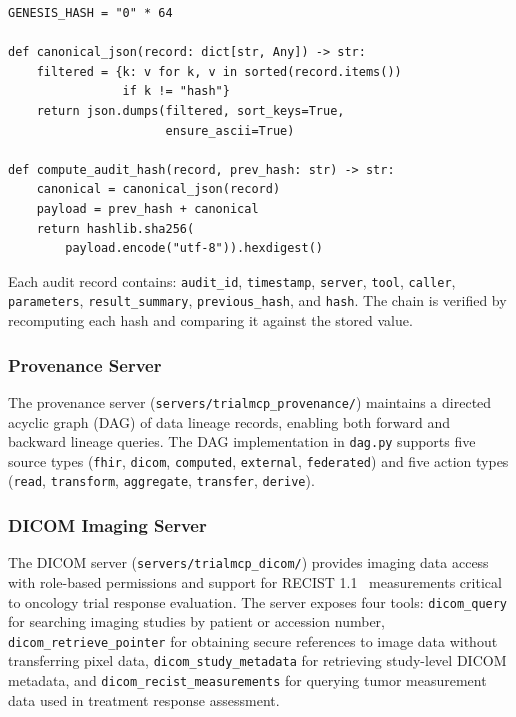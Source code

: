 \documentclass{article}
\begin{document}
\begin{lstlisting}[caption={Hash-chained audit record computation from \texttt{servers/trialmcp\_ledger/chain.py}.},label={lst:chain}]
GENESIS_HASH = "0" * 64

def canonical_json(record: dict[str, Any]) -> str:
    filtered = {k: v for k, v in sorted(record.items())
                if k != "hash"}
    return json.dumps(filtered, sort_keys=True,
                      ensure_ascii=True)

def compute_audit_hash(record, prev_hash: str) -> str:
    canonical = canonical_json(record)
    payload = prev_hash + canonical
    return hashlib.sha256(
        payload.encode("utf-8")).hexdigest()
\end{lstlisting}

Each audit record contains: \texttt{audit\_id}, \texttt{timestamp}, \texttt{server}, \texttt{tool}, \texttt{caller}, \texttt{parameters}, \texttt{result\_summary}, \texttt{previous\_hash}, and \texttt{hash}. The chain is verified by recomputing each hash and comparing it against the stored value.

\subsubsection{Provenance Server}

The provenance server (\texttt{servers/trialmcp\_provenance/}) maintains a directed acyclic graph (DAG) of data lineage records, enabling both forward and backward lineage queries. The DAG implementation in \texttt{dag.py} supports five source types (\texttt{fhir}, \texttt{dicom}, \texttt{computed}, \texttt{external}, \texttt{federated}) and five action types (\texttt{read}, \texttt{transform}, \texttt{aggregate}, \texttt{transfer}, \texttt{derive}).

\subsubsection{DICOM Imaging Server}

The DICOM server (\texttt{servers/trialmcp\_dicom/}) provides imaging data access with role-based permissions and support for RECIST 1.1~\cite{eisenhauer2009recist} measurements critical to oncology trial response evaluation. The server exposes four tools: \texttt{dicom\_query} for searching imaging studies by patient or accession number, \texttt{dicom\_retrieve\_pointer} for obtaining secure references to image data without transferring pixel data, \texttt{dicom\_study\_metadata} for retrieving study-level DICOM metadata, and \texttt{dicom\_recist\_measurements} for querying tumor measurement data used in treatment response assessment.
\end{document}
